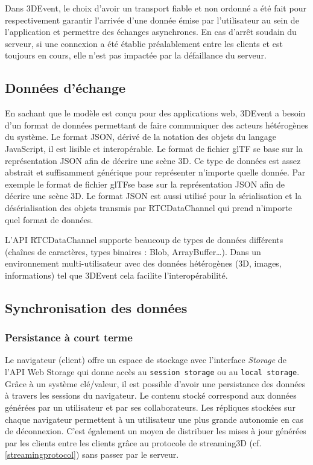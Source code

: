 Dans 3DEvent, le choix d'avoir un transport 
fiable et non ordonné a été fait pour respectivement 
garantir l'arrivée d'une donnée émise par l'utilisateur au sein de l'application et 
permettre des échanges asynchrones.
En cas d'arrêt soudain du serveur, si une connexion a été établie préalablement 
entre les clients et est toujours en cours, elle n'est pas impactée par la défaillance 
du serveur.
\subsection{Données d'échange}
En sachant que le modèle est conçu pour des applications web, 3DEvent a besoin 
d'un format de données permettant de faire communiquer des acteurs hétérogènes 
du système. Le format \gls{JSON}, dérivé de la notation des objets du langage 
JavaScript, il est lisible et interopérable. 
Le format de fichier \gls{glTF} se base sur la représentation \gls{JSON} afin de 
décrire une scène 3D.
Ce type de données est assez abstrait et suffisamment générique pour 
représenter n'importe quelle donnée. Par exemple le format de fichier 
\gls{glTF}se base sur la représentation \gls{JSON} afin de 
décrire une scène 3D.
Le format \gls{JSON} est aussi utilisé pour la sérialisation et la désérialisation des 
objets transmis par RTCDataChannel qui prend n'importe quel format de données.

L'\acrshort{API} RTCDataChannel supporte beaucoup de types de données 
différents (chaînes de caractères, types binaires : Blob, ArrayBuffer\dots). Dans 
un environnement multi-utilisateur avec des données hétérogènes (3D, images, 
informations) tel que 3DEvent cela facilite l'interopérabilité.


\subsection{Synchronisation des données}
\subsubsection{Persistance à court terme}
Le navigateur (client) offre un espace de stockage avec l'interface \textit{Storage} 
de l'API Web Storage qui donne accès au \texttt{session storage} ou au  
\texttt{local storage}. Grâce à un système clé/valeur, il est possible d'avoir une 
persistance des données à travers les sessions du navigateur. Le contenu stocké 
correspond aux données générées par un utilisateur et par ses collaborateurs. Les 
répliques stockées sur chaque navigateur permettent à un utilisateur une plus 
grande 
autonomie en cas de déconnexion. C'est également un moyen de distribuer les 
mises à jour générées par les clients entre les clients grâce au protocole de 
\gls{streaming3D} (cf. \ref{streamingprotocol}) sans passer par le serveur.

